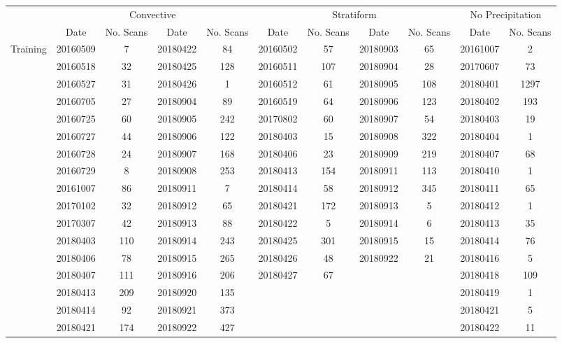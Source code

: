 \begin{table}[ht]
	\centering
	\begin{adjustbox}{width=\columnwidth,center}
	\begin{tabular}{c|cccc|cccc|cc}
		& \multicolumn{4}{|c|}{ Convective } & \multicolumn{4}{|c|}{ Stratiform } & \multicolumn{2}{|c}{ No Precipitation } \\
		& Date & No. Scans & Date & No. Scans & Date & No. Scans & Date & No. Scans & Date & No. Scans \\
		\hline
		\multirow{29}{*}{ Training } & 20160509 & 7 & 20180422 & 84 & 20160502 & 57 & 20180903 & 65 & 20161007 & 2 \\ 
		& 20160518 & 32 & 20180425 & 128 & 20160511 & 107 & 20180904 & 28 & 20170607 & 73 \\
		& 20160527 & 31 & 20180426 & 1 & 20160512 & 61 & 20180905 & 108 & 20180401 & 1297 \\
		& 20160705 & 27 & 20180904 & 89 & 20160519 & 64 & 20180906 & 123 & 20180402 & 193 \\
		& 20160725 & 60 & 20180905 & 242 & 20170802 & 60 & 20180907 & 54 & 20180403 & 19 \\
		& 20160727 & 44 & 20180906 & 122 & 20180403 & 15 & 20180908 & 322 & 20180404 & 1 \\
		& 20160728 & 24 & 20180907 & 168 & 20180406 & 23 & 20180909 & 219 & 20180407 & 68 \\
		& 20160729 & 8 & 20180908 & 253 & 20180413 & 154 & 20180911 & 113 & 20180410 & 1 \\
		& 20161007 & 86 & 20180911 & 7 & 20180414 & 58 & 20180912 & 345 & 20180411 & 65 \\
		& 20170102 & 32 & 20180912 & 65 & 20180421 & 172 & 20180913 & 5 & 20180412 & 1 \\
		& 20170307 & 42 & 20180913 & 88 & 20180422 & 5 & 20180914 & 6 & 20180413 & 35 \\
		& 20180403 & 110 & 20180914 & 243 & 20180425 & 301 & 20180915 & 15 & 20180414 & 76 \\
		& 20180406 & 78 & 20180915 & 265 & 20180426 & 48 & 20180922 & 21 & 20180416 & 5 \\
		& 20180407 & 111 & 20180916 & 206 & 20180427 & 67 & & & 20180418 & 109 \\
		& 20180413 & 209 & 20180920 & 135 & & & & & 20180419 & 1 \\
		& 20180414 & 92 & 20180921 & 373 & & & & & 20180421 & 5 \\
		& 20180421 & 174 & 20180922 & 427 & & & & & 20180422 & 11 \\

\end{tabular}
\end{adjustbox}
\end{table}
